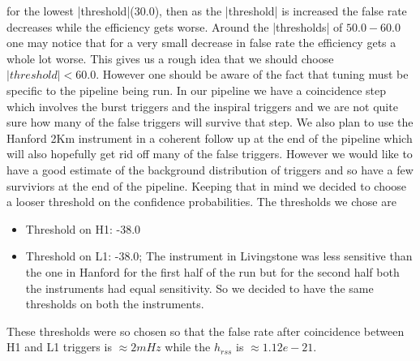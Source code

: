 \documentclass[10pt]{article}
\begin{document}
for the lowest |threshold|(30.0),  then as the |threshold| is increased
the false rate decreases while the efficiency gets worse. Around the 
|thresholds| of $50.0 - 60.0$ one may notice that for a very small 
decrease in false rate the efficiency gets a whole lot worse.  This gives 
us a rough idea that we should choose $ |threshold| < 60.0$.  However
one should be aware of the fact that tuning must be specific to the 
pipeline being run.  In our pipeline we have a coincidence step which
involves the burst triggers and the inspiral triggers and we are not
quite sure how many of the false triggers will survive that step. We
also plan to use the Hanford 2Km instrument in a coherent follow up at
the end of the pipeline which will also hopefully get rid off many of the
false triggers. However we would like to  
have a good estimate of the background distribution of triggers and so 
have a few surviviors at the end of the pipeline.  Keeping that 
in mind we decided to choose a looser threshold on the confidence 
probabilities. The thresholds we chose are 
\begin{itemize}
\item Threshold on H1: -38.0
\item Threshold on L1: -38.0; The instrument in Livingstone was less 
sensitive than the one in Hanford for the first half of the run but 
for the second half both the instruments had equal sensitivity.  So
we decided to have the same thresholds on both the instruments.
\end{itemize}      
These thresholds were so chosen so that the false rate after 
coincidence between H1 and L1 triggers is $\approx 2 mHz$ while 
the $ h_{rss}$ is $\approx 1.12e-21$.



\end{document}
